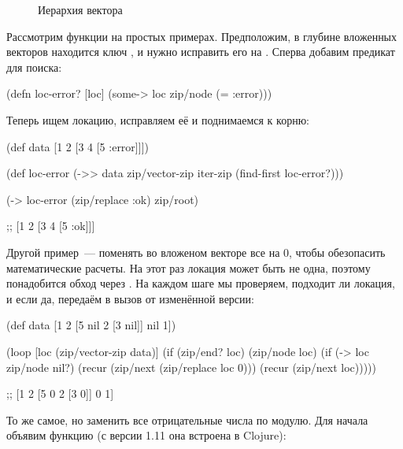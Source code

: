\begin{figure}[H]
  \centering
  
  \caption{Иерархия вектора}
  \label{fig:chart-zip-12}
\end{figure}

Рассмотрим функции на простых примерах. Предположим, в глубине вложенных
векторов находится ключ , и нужно исправить его на . Сперва добавим
предикат для поиска:

\begin{english}
  \begin{clojure}
(defn loc-error? [loc]
  (some-> loc zip/node (= :error)))
  \end{clojure}
\end{english}

Теперь ищем локацию, исправляем её и поднимаемся к корню:

\begin{english}
  \begin{clojure}
(def data [1 2 [3 4 [5 :error]]])

(def loc-error
  (->> data
       zip/vector-zip
       iter-zip
       (find-first loc-error?)))

(-> loc-error
    (zip/replace :ok)
    zip/root)

;; [1 2 [3 4 [5 :ok]]]
  \end{clojure}
\end{english}

Другой пример~--- поменять во вложеном векторе все  на 0, чтобы обезопасить
математические расчеты. На этот раз локация может быть не одна, поэтому
понадобится обход через . На каждом шаге мы проверяем, подходит ли
локация, и если да, передаём в  вызов  от изменённой версии:

\begin{english}
  \begin{clojure}
(def data [1 2 [5 nil 2 [3 nil]] nil 1])

(loop [loc (zip/vector-zip data)]
  (if (zip/end? loc)
    (zip/node loc)
    (if (-> loc zip/node nil?)
      (recur (zip/next (zip/replace loc 0)))
      (recur (zip/next loc)))))

;; [1 2 [5 0 2 [3 0]] 0 1]
  \end{clojure}
\end{english}

То же самое, но заменить все отрицательные числа по модулю. Для начала объявим
функцию  (с версии 1.11 она встроена в Clojure):

